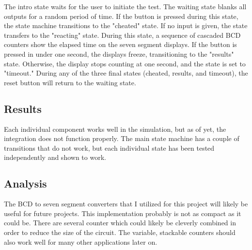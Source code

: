 \documentclass{article}
\begin{document}
	The intro state waits for the user to initiate the test. The waiting state blanks all outputs for a random period of time. If the button is pressed during this state, the state machine transitions to the "cheated" state. If no input is given, the state transfers to the "reacting" state. During this state, a sequence of cascaded BCD counters show the elapsed time on the seven segment displays. If the button is pressed in under one second, the displays freeze, transitioning to the "results" state. Otherwise, the display stops counting at one second, and the state is set to "timeout." During any of the three final states (cheated, results, and timeout), the reset button will return to the waiting state.
	
	\subsection*{Results}
	Each individual component works well in the simulation, but as of yet, the integration does not function properly. The main state machine has a couple of transitions that do not work, but each individual state has been tested independently and shown to work.
	
	\subsection*{Analysis}
	The BCD to seven segment converters that I utilized for this project will likely be useful for future projects. This implementation probably is not as compact as it could be. There are several counter which could likely be cleverly combined in order to reduce the size of the circuit. The variable, stackable counters should also work well for many other applications later on.
	
\end{document}
